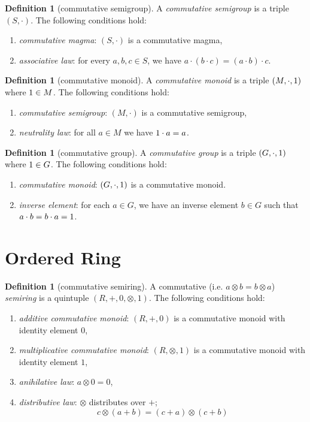 \documentclass{article}
\theoremstyle{definition}
\newtheorem{definition}[theorem]{Definition}
\newcommand{\ONE}{\mbox{\boldmath{1}}}
\begin{document}
\begin{definition}[commutative semigroup]
A {\em commutative semigroup} is a triple 
$(S,\cdot)$. 
The following conditions hold:
%
\begin{enumerate} 
\item {\em commutative magma}:  $(S,\cdot)$ is a commutative magma,
\item {\em associative law}:  for every $a,b,c \in S$,
we have $a \cdot ( b \cdot c) =  (a \cdot b) \cdot c$.
\end{enumerate}
\end{definition} 

\begin{definition}[commutative monoid]
A {\em commutative  monoid} is a triple 
$(M,\cdot,\ONE)$  where $\ONE \in M$. 
The following conditions hold:
%
\begin{enumerate} 
\item {\em commutative semigroup}:  $(M,\cdot)$ is a commutative semigroup,
\item {\em neutrality law}:  for all  $a \in M$  we have $\ONE \cdot a = a$.
\end{enumerate}
\end{definition} 

\begin{definition}[commutative group]
A {\em commutative group} is a triple 
$(G,\cdot,\ONE) $  where $\ONE \in G$. 
The following conditions hold:
%
\begin{enumerate} 
\item {\em commutative monoid}:  $(G,\cdot,\ONE) $ is a commutative monoid.
\item {\em inverse element}:  for each $a \in G$,
we have an inverse element $b \in G$ 
such that $a \cdot b =  b \cdot a = \ONE$.
\end{enumerate}
\end{definition} 

\section{Ordered Ring}

\begin{definition}[commutative semiring]
A commutative (i.e. $a \otimes b = b \otimes a$)
{\em semiring} is a quintuple $(R,+,0,\otimes,1) $.
The following conditions hold:
%
\begin{enumerate} 
\item {\em additive commutative monoid}:
$(R,+,0)$ is a commutative monoid with identity element $0$,
\item {\em multiplicative commutative monoid}:
$(R,\otimes,1)$ is a commutative monoid with identity element $1$, 
\item {\em anihilative law}:  $a \otimes 0 = 0$,
\item {\em distributive law}:
$\otimes$ distributes over $+$;
\[ c \otimes (a + b) = (c+a) \otimes (c+b) \]
\end{enumerate}
\end{definition}
\end{document}
